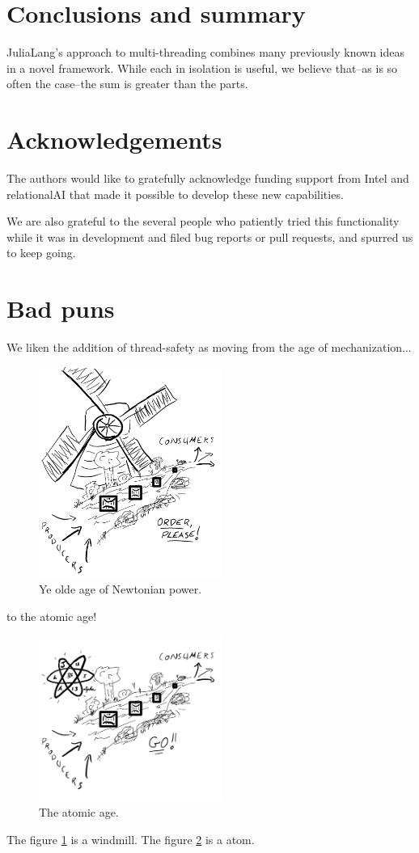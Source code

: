 \documentclass{juliacon}
\begin{document}
\section{Conclusions and summary}
\label{subsub:conclusion}

JuliaLang's approach to multi-threading combines many previously known ideas in a novel framework. While each in isolation is useful, we believe that--as is so often the case--the sum is greater than the parts.

\section{Acknowledgements}
\label{subsub:acknowledgements}

The authors would like to gratefully acknowledge funding support from Intel and relationalAI that made it possible to develop these new capabilities.

We are also grateful to the several people who patiently tried this functionality while it was in development and filed bug reports or pull requests, and spurred us to keep going.


\section{Bad puns}
\label{subsub:puns}

We liken the addition of thread-safety as moving from the age of mechanization...

\begin{figure}[h]
\centerline{\includegraphics[width=6cm]{images/threads_windmill.png}}
\caption{Ye olde age of Newtonian power.}
\label{fig:windmill}
\end{figure}

to the atomic age!

\begin{figure}[h]
\centerline{\includegraphics[width=6cm]{images/threads_atomic.png}}
\caption{The atomic age.}
\label{fig:atomic}
\end{figure}


The figure \ref{fig:windmill} is a windmill.
The figure \ref{fig:atomic} is a atom.


\end{document}
